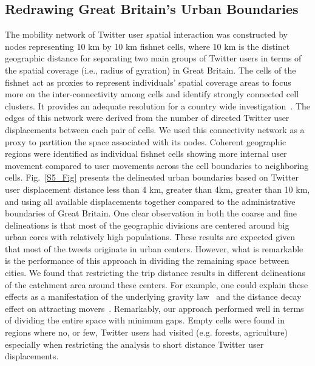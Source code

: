 \documentclass[]{tGIS2e}
\begin{document}
\subsection{Redrawing Great Britain's Urban Boundaries}
The mobility network of Twitter user spatial interaction was constructed by nodes representing 10 km by 10 km fishnet cells, where 10 km is the distinct geographic distance for separating two main groups of Twitter users in terms of the spatial coverage (i.e., radius of gyration) in Great Britain.
The cells of the fishnet act as proxies to represent individuals' spatial coverage areas to focus more on the inter-connectivity among cells and identify strongly connected cell clusters.
It provides an adequate resolution for a country wide investigation~\citep{ratti2010}.
The edges of this network were derived from the number of directed Twitter user displacements between each pair of cells.
We used this connectivity network as a proxy to partition the space associated with its nodes.
Coherent geographic regions were identified as individual fishnet cells showing more internal user movement compared to user movements across the cell boundaries to neighboring cells.
Fig.~\ref{S5_Fig}  presents the delineated urban boundaries based on Twitter user displacement distance less than 4 km, greater than 4km, greater than 10 km, and using all available displacements together compared to the administrative boundaries of Great Britain.
One clear observation in both the coarse and fine delineations is that most of the geographic divisions are centered around big urban cores with relatively high populations.
These results are expected given that most of the tweets originate in urban centers.
However, what is remarkable is the performance of this approach in dividing the remaining space between cities.
We found that restricting the trip distance results in different delineations of the catchment area around these centers.
For example, one could explain these effects as a manifestation of the underlying gravity law~\citep{simini2012} and the distance decay effect on attracting movers~\citep{gonzalez2008}.
Remarkably, our approach performed well in terms of dividing the entire space with minimum gaps.
Empty cells were found in regions where no, or few, Twitter users had visited (e.g. forests, agriculture) especially when restricting the analysis to short distance Twitter user displacements.
\end{document}
